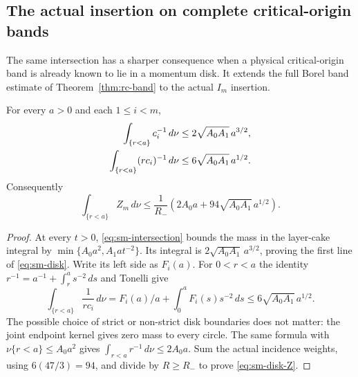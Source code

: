 \subsection{The actual insertion on complete critical-origin bands}
The same intersection has a sharper consequence when a physical
critical-origin band is already known to lie in a momentum disk.
It extends the full Borel band estimate of
Theorem~\ref{thm:rc-band} to the actual $I_m$ insertion.

\begin{lemma}
\label{lem:sm-disk}
For every $a>0$ and each $1\le i<m$,
\begin{align}\label{eq:sm-disk}
 \int_{\{r<a\}}c_i^{-1}\,d\nu
             &\le2\sqrt{A_0A_1}\,a^{3/2},\notag\\
 \int_{\{r<a\}}(r c_i)^{-1}\,d\nu
             &\le6\sqrt{A_0A_1}\,a^{1/2}.
\end{align}
Consequently
\begin{equation}\label{eq:sm-disk-Z}
 \int_{\{r<a\}}Z_m\,d\nu
  \le\frac1{R_-}
             \left(2A_0a+94\sqrt{A_0A_1}\,a^{1/2}\right).
\end{equation}
\end{lemma}
\begin{proof}
At every $t>0$, \eqref{eq:sm-intersection} bounds the mass in
the layer-cake integral by
$\min\{A_0a^2,A_1a t^{-2}\}$.
Its integral is $2\sqrt{A_0A_1}\,a^{3/2}$, proving the first
line of \eqref{eq:sm-disk}.  Write its left side as $F_i(a)$.
For $0<r<a$ the identity
$r^{-1}=a^{-1}+\int_r^a s^{-2}\,ds$ and Tonelli give
\[
 \int_{\{r<a\}}\frac1{r c_i}\,d\nu
       =F_i(a)/a+\int_0^a F_i(s)s^{-2}\,ds
       \le6\sqrt{A_0A_1}\,a^{1/2}.
\]
The possible choice of strict or non-strict disk boundaries does
not matter: the joint endpoint kernel gives zero mass to every
circle.  The same formula with $\nu\{r<a\}\le A_0a^2$ gives
$\int_{r<a}r^{-1}\,d\nu\le2A_0a$.
Sum the actual incidence weights, using $6(47/3)=94$, and
divide by $R\ge R_-$ to prove \eqref{eq:sm-disk-Z}.
\end{proof}

